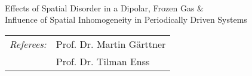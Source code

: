 \begin{titlepage}
    \begin{center}
        \large

        \hfill

        \vfill

        \begingroup
            \color{CTtitle} \\ \bigskip\bigskip
        Effects of Spatial Disorder in a Dipolar, Frozen Gas \&\\
        Influence of Spatial Inhomogeneity in Periodically Driven Systems
        \endgroup

        \vfill

    \end{center}
    \vfill
    \begin{center}
        \begin{tabular}{ll}
             \textit{Referees:}\hspace{0.5cm} & Prof. Dr. Martin Gärttner\\
             & Prof. Dr. Tilman Enss
        \end{tabular}
    \end{center}
\end{titlepage}
